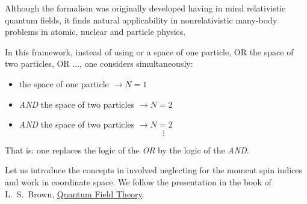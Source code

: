 \documentclass[12pt]{article}
\begin{document}

Although the formalism was originally developed having
in mind relativistic quantum fields, it finds natural
applicability in nonrelativistic many-body problems in
atomic, nuclear and particle physics.

In this framework, instead of using or a space of
one particle, OR the space of two particles, OR $\ldots$, one
considers simultaneously:
\begin{itemize}
\item the space of one particle $\rightarrow N=1$
\item \emph{AND} the space of two particles $\rightarrow N=2$
\item \emph{AND} the space of two particles $\rightarrow N=2$
\[\vdots\]
\end{itemize}
That is: one replaces the logic of the \emph{OR} by
the logic of the \emph{AND}.

Let us introduce the concepts in involved neglecting for
the moment spin indices and work in coordinate
space. We follow the presentation in the book of
L.~S.~Brown, \href{https://www.cambridge.org/core/books/quantum-field-theory/276D2EE40D4929469FED764BFF57186D}{Quantum Field Theory}.

\end{document}
